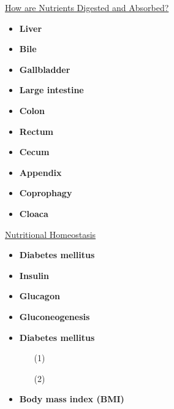 \documentclass[12pt,letterpaper]{article}
\begin{document}
\begin{secbox}{\hyperlink{41}{How are Nutrients Digested and Absorbed?}}
{\begin{itemize}
        \item \textbf{Liver}
        \item \textbf{Bile}
        \item \textbf{Gallbladder}
        \item \textbf{Large intestine}
        \item \textbf{Colon}
        \item \textbf{Rectum}
        \item \textbf{Cecum}
        \item \textbf{Appendix}
        \item \textbf{Coprophagy}
        \item \textbf{Cloaca}
    \end{itemize}
}\end{secbox}

\hypertarget{41.4}{}
\begin{secbox}{\hyperlink{41}{Nutritional Homeostasis}}{
    \begin{itemize}
        \item \textbf{Diabetes mellitus}
        \item \textbf{Insulin}
        \item \textbf{Glucagon}
        \item \textbf{Gluconeogenesis}
        \item \textbf{Diabetes mellitus}
            \begin{itemize}
                \item [(1)]
                \item [(2)]
            \end{itemize}
        \item \textbf{Body mass index (BMI)}
    \end{itemize}
}\end{secbox}
\end{document}
